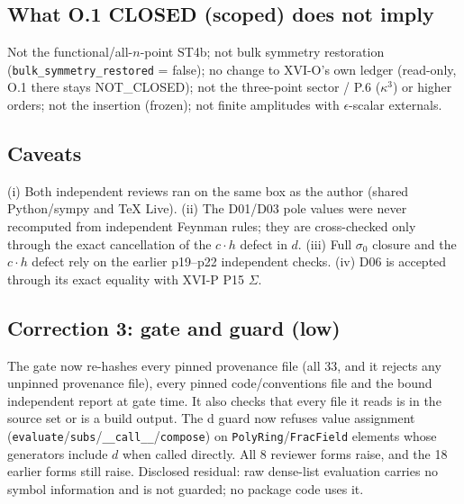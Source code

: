 \subsection{What O.1 CLOSED (scoped) does not imply}
Not the functional/all-$n$-point ST4b; not bulk symmetry restoration (\texttt{bulk\_symmetry\_restored} = false);
no change to XVI-O's own ledger (read-only, O.1 there stays NOT\_CLOSED); not the three-point sector / P.6
($\kappa^3$) or higher orders; not the insertion (frozen); not finite amplitudes with $\epsilon$-scalar externals.

\subsection{Caveats}
(i) Both independent reviews ran on the same box as the author (shared Python/sympy and TeX Live).
(ii) The D01/D03 pole values were never recomputed from independent Feynman rules; they are cross-checked only
through the exact cancellation of the $c\!\cdot\!h$ defect in $d$.
(iii) Full $\sigma_0$ closure and the $c\!\cdot\!h$ defect rely on the earlier p19--p22 independent checks.
(iv) D06 is accepted through its exact equality with XVI-P P15 $\Sigma$.

\subsection{Correction 3: gate and guard (low)}
The gate now re-hashes every pinned provenance file (all 33, and it rejects any unpinned provenance file), every
pinned code/conventions file and the bound independent report at gate time. It also checks that every file it reads
is in the source set or is a build output. The d guard now refuses value assignment
(\texttt{evaluate}/\texttt{subs}/\texttt{\_\_call\_\_}/\texttt{compose}) on \texttt{PolyRing}/\texttt{FracField}
elements whose generators include $d$ when called directly. All 8 reviewer forms raise, and the 18 earlier forms still
raise. Disclosed residual: raw dense-list evaluation carries no symbol information and is not guarded; no package code
uses it.
